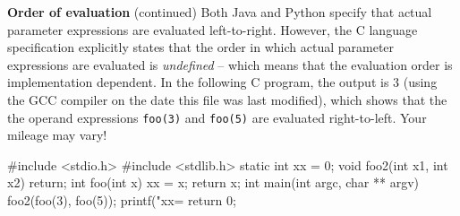 \begin{minipage}[t]{\sw}
\slidenumber
\LARGE
{\bf Order of evaluation} (continued)\exx
Both Java and Python specify that actual parameter expressions
are evaluated left-to-right.
However, the C language specification
explicitly states that the order
in which actual parameter expressions are evaluated is {\em undefined} --
which means that the evaluation order is implementation dependent.
In the following C program, the output is 3
(using the GCC compiler on the date this file was last modified),
which shows that the the operand expressions
\verb'foo(3)' and \verb'foo(5)' are evaluated right-to-left.
Your mileage may vary!
{\Large
\begin{qv}
#include <stdio.h>
#include <stdlib.h>
static int xx = 0;
void foo2(int x1, int x2) {
    return;
}
int foo(int x) {
    xx = x;
    return x;
}
int main(int argc, char ** argv) {
    foo2(foo(3), foo(5));
    printf("xx=%
    return 0;
}
\end{qv}
}
\end{minipage}
\clearpage
